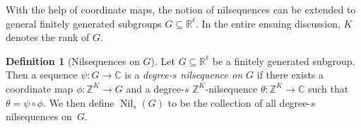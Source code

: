 \documentclass[11pt]{amsart}
\theoremstyle{definition}
\newtheorem{definition}[lemma]{Definition}
\DeclareMathOperator*{\E}{\mathbb{E}}
\newcommand{\C}{{\mathbb C}}
\newcommand{\R}{{\mathbb R}}
\newcommand{\Z}{{\mathbb Z}}
\newcommand{\bm}{{\mathbf{m}}}
\newcommand{\veps}{\varepsilon}
\newcommand{\inv}{^{-1}}
\newcommand{\1}{{\mathbf{1}}}
\DeclareMathOperator{\Nil}{Nil}
\begin{document}
With the help of coordinate maps, the notion of nilsequences can be extended to general finitely generated subgroups $G\subseteq\R^\ell$. In the entire ensuing discussion, $K$ denotes the rank of $G$.
\begin{definition}[Nilsequences on $G$]
Let $G\subseteq\R^\ell$ be a finitely generated subgroup. Then a sequence $\psi:G\to\C$ is a \textit{degree-$s$ nilsequence on $G$} if there exists a coordinate map $\phi:\Z^K\to G$ 
and a  degree-$s$ $\Z^{K}$-nilsequence $\theta\colon \Z^{K}\to \C$ such that $\theta=\psi\circ \phi$.
 We then define $\Nil_s(G)$ to be the collection of all degree-$s$ nilsequences on~$G$.
\end{definition}
\end{document}

